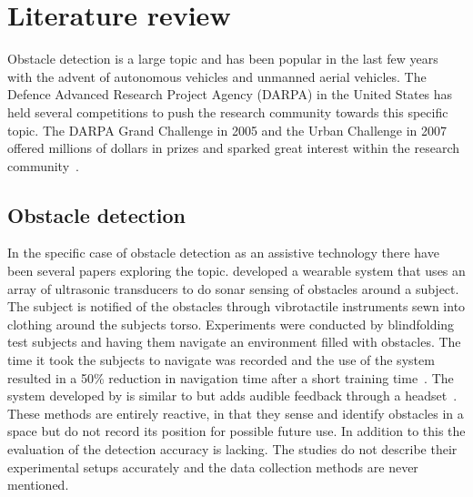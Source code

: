 \documentclass[prodmode,acmtosem]{acmsmall} %
\begin{document}
\section{Literature review} %
Obstacle detection is a large topic and has been popular in the last few years with the advent of autonomous vehicles and unmanned aerial vehicles.
The Defence Advanced Research Project Agency (DARPA) in the United States has held several competitions to push the research community towards this specific topic. The DARPA Grand Challenge in 2005 and the Urban Challenge in 2007 offered millions of dollars in prizes and sparked great interest within the research community~\cite{DARPAGrandChallenge2005,DARPAUrbanChallenge2007}.
\subsection{Obstacle detection}
In the specific case of obstacle detection as an assistive technology there have been several papers exploring the topic. \citet{Cardin2007} developed a wearable system that uses an array of ultrasonic transducers to do sonar sensing of obstacles around a subject. The subject is notified of the obstacles through vibrotactile instruments sewn into clothing around the subjects torso. Experiments were conducted by blindfolding test subjects and having them navigate an environment filled with obstacles. The time it took the subjects to navigate was recorded and the use of the system resulted in a 50\% reduction in navigation time after a short training time~\cite{Cardin2007}. The system developed by \citet{Shin2007} is similar to \citet{Cardin2007} but adds audible feedback through a headset~\cite{Shin2007}. These methods are entirely reactive, in that they sense and identify obstacles in a space but do not record its position for possible future use. In addition to this the evaluation of the detection accuracy is lacking. The studies do not describe their experimental setups accurately and the data collection methods are never mentioned. 
\end{document}
